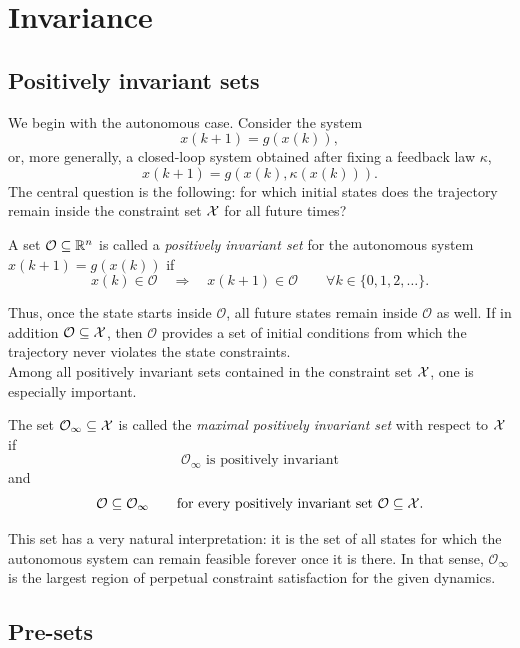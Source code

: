 \section{Invariance}

\subsection{Positively invariant sets}

We begin with the autonomous case. Consider the system
\[
x(k+1)=g(x(k)),
\]
or, more generally, a closed-loop system obtained after fixing a feedback law \(\kappa\),
\[
x(k+1)=g(x(k),\kappa(x(k))).
\]
The central question is the following: for which initial states does the trajectory remain inside the
constraint set \(\mathcal{X}\) for all future times?

\begin{theorembox}
A set \(\mathcal O\subseteq \mathbb{R}^n\) is called a \emph{positively invariant set} for the autonomous system
\(x(k+1)=g(x(k))\) if
\[
x(k)\in \mathcal O \quad \Longrightarrow \quad x(k+1)\in \mathcal O
\qquad \forall k\in \{0,1,2,\dots\}.
\] 
\end{theorembox}

Thus, once the state starts inside \(\mathcal O\), all future states remain inside \(\mathcal O\) as well.
If in addition \(\mathcal O\subseteq \mathcal{X}\), then \(\mathcal O\) provides a set of initial conditions from
which the trajectory never violates the state constraints.\\
Among all positively invariant sets contained in the constraint set \(\mathcal{X}\), one is especially important.

\begin{theorembox}
The set \(\mathcal O_\infty\subseteq \mathcal{X}\) is called the \emph{maximal positively invariant set} with
respect to \(\mathcal{X}\) if
\[
\mathcal O_\infty \text{ is positively invariant}
\]
and
\[
\mathcal O \subseteq \mathcal O_\infty
\qquad
\text{for every positively invariant set } \mathcal O \subseteq \mathcal{X}.
\]
\end{theorembox}

This set has a very natural interpretation: it is the set of all states for which the autonomous
system can remain feasible forever once it is there. In that sense, \(\mathcal O_\infty\) is the largest
region of perpetual constraint satisfaction for the given dynamics.

\subsection{Pre-sets}

